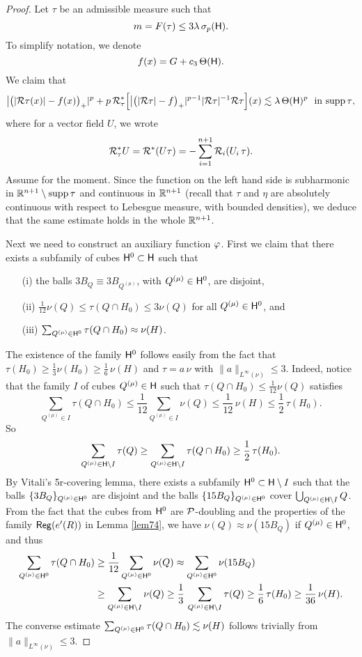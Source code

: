 \begin{proof}
Let $\tau$ be an admissible measure such that 
\begin{equation}\label{e.admis2}
	m=F(\tau)\leq 3\lambda\,\sigma_p({\mathsf{H}}).
\end{equation}
To simplify notation, we denote
$$f(x) = G + c_3\,\Theta({\mathsf{H}}).$$
We claim that
\begin{equation}\label{eqclaim*}
\bigl|\bigl(|{\mathcal R}\tau(x)| - f(x)\bigr)_+|^p + 
p \,{\mathcal R}_\tau^*\Bigl[\bigl|\bigl(|{\mathcal R}\tau| - f\bigr)_+|^{p-1} |{\mathcal R}\tau|^{-1} {\mathcal R}\tau \Bigr](x)
 \lesssim \lambda\,\Theta({\mathsf{H}})^p \quad \text{\!\!in $\operatorname{supp}\tau$,}
\end{equation}
where for a vector field $U$, we wrote
$${\mathcal R}_\tau^*U ={\mathcal R}^*(U\tau) = -\sum_{i=1}^{n+1}{\mathcal R}_i(U_i\,\tau).$$
Assume  for the moment. Since the function on the left hand side is subharmonic
in ${\mathbb R}^{n+1}\setminus\operatorname{supp}\tau$ 
and continuous in ${\mathbb R}^{n+1}$ (recall that $\tau$ and $\eta$ are absolutely continuous with respect to Lebesgue measure, with bounded densities), we deduce that the same estimate holds in the whole ${\mathbb R}^{n+1}$.

Next we need to construct an auxiliary function ${\varphi}$. First we claim that 
there exists a subfamily of cubes ${\mathsf{H}}^0\subset {\mathsf{H}}$ such that
\begin{itemize}
\item[(i)] the balls $3B_Q\equiv3B_{Q^{(\mu)}}$, with $Q^{(\mu)}\in{\mathsf{H}}^0$, are disjoint,
\item[(ii)] $\frac1{12}\nu(Q)\leq \tau(Q\cap H_0)\leq 3 \nu(Q)$ for all $Q^{(\mu)}\in{\mathsf{H}}^0$, and
\item[(iii)] $\sum_{Q^{(\mu)}\in{\mathsf{H}}^0}\tau(Q\cap H_0)\approx \nu(H)$.
\end{itemize}
The existence of the family ${\mathsf{H}}^0$ follows easily from the fact that
 $\tau(H_0)\geq\frac13\nu(H_0)\geq \frac16\,\nu(H)$ and $\tau=a\,\nu$ with $\|a\|_{L^\infty(\nu)}\leq 3$. Indeed,
 notice that the family $I$ of cubes $Q^{(\mu)}\in {\mathsf{H}}$ such that 
$\tau(Q\cap H_0)\leq \frac1{12}\nu(Q)$ satisfies
$$\sum_{Q^{(\mu)}\in I}\tau(Q\cap H_0)\leq \frac1{12}\sum_{Q^{(\mu)}\in I}\nu(Q)\leq \frac1{12}\,\nu(H)
\leq \frac12\,\tau(H_0).$$
So
$$\sum_{Q^{(\mu)}\in {\mathsf{H}}\setminus I} \tau(Q)\geq \sum_{Q^{(\mu)}\in {\mathsf{H}}\setminus I} \tau(Q\cap H_0)\geq \frac12\,\tau(H_0).$$
By Vitali's 5r-covering lemma, there exists a subfamily $ {\mathsf{H}}^0\subset {\mathsf{H}}\setminus I$ 
such that the balls $\{3B_{Q}\}_{Q^{(\mu)} \in{\mathsf{H}}^0}$ are disjoint and the balls $\{15B_{Q}\}_{Q^{(\mu)}\in{\mathsf{H}}^0}$ cover
$\bigcup_{Q^{(\mu)}\in {\mathsf{H}}\setminus I}Q$. From the fact that the cubes from ${\mathsf{H}}^0$ are ${\mathcal P}$-doubling and the properties of the family ${\mathsf{Reg}}(e'(R))$ in Lemma \ref{lem74}, we have
$\nu(Q) \approx \nu(15B_Q)$ if $Q^{(\mu)}\in{\mathsf{H}}^0$, and thus
\begin{align*}
\sum_{Q^{(\mu)}\in{\mathsf{H}}^0} \tau(Q\cap H_0) & \geq \frac1{12}\sum_{Q^{(\mu)}\in{\mathsf{H}}^0} \nu(Q) \approx
\sum_{Q^{(\mu)}\in{\mathsf{H}}^0} \nu(15B_Q) \\
& \geq \sum_{Q^{(\mu)}\in {\mathsf{H}}\setminus I} \nu(Q)\geq \frac13\,
\sum_{Q^{(\mu)}\in {\mathsf{H}}\setminus I} \tau(Q)\geq \frac16\,\tau(H_0)\geq \frac1{36}\,\nu(H).
\end{align*}
The converse estimate $\sum_{Q^{(\mu)}\in{\mathsf{H}}^0}\tau(Q\cap H_0)\lesssim \nu(H)$ follows trivially from  $\|a\|_{L^\infty(\nu)}\leq3$.


\end{proof}
